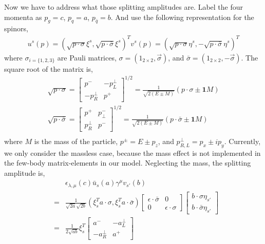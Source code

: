 \begin{appendices}
Now we have to address what those splitting amplitudes are.
Label the four momenta as $p_g = c$, $p_q = a$, $p_{\bar{q}} = b$.
And use the following representation for the spinors,
\begin{eqnarray}
u^s(p) = (\sqrt{p\cdot \sigma} \xi^s, \sqrt{p\cdot \bar{\sigma}} \xi^s)^T
v^s(p) = (\sqrt{p\cdot \sigma} \eta^s, -\sqrt{p\cdot \bar{\sigma}} \eta^s)^T
\end{eqnarray}
where $\sigma_{i=\{1,2,3\}}$ are Pauli matrices, $\sigma = (1_{2\times 2}, \vec{\sigma})$, and $\bar{\sigma} = (1_{2\times 2}, -\vec{\sigma})$.
The square root of the matrix is,
\begin{eqnarray}
\sqrt{p\cdot \sigma} =
\left.
\begin{bmatrix}
p^- & -p_L^\perp \\
-p_R^\perp & p^+
\end{bmatrix}\right.^{1/2} 
= \frac{1}{\sqrt{2(E\pm M)}}(p\cdot\sigma \pm \mathbf{1}M)\\
\sqrt{p\cdot \bar{\sigma}} =
\left.
\begin{bmatrix}
p^+ & p_\perp^- \\
p_R^\perp & p^-
\end{bmatrix}\right.^{1/2} 
= \frac{1}{\sqrt{2(E\pm M)}}(p\cdot\bar{\sigma} \pm \mathbf{1}M)\\
\end{eqnarray}
where $M$ is the mass of the particle, $p^\pm = E\pm p_z$, and $p_{R,L}^\perp = p_x \pm  i p_y$.
Currently, we only consider the massless case, because the mass effect is not implemented in the few-body matrix-elements in our model.
Neglecting the mass, the splitting amplitude is,
\begin{eqnarray}
&&\epsilon_{\lambda, \mu}(c) \bar{u}_s(a)\gamma^\mu v_{s'}(b)\\
&=&\frac{1}{\sqrt{2a}\sqrt{2b}}(\xi^T_s a\cdot\sigma, \xi^T_{s} a\cdot \bar{\sigma})
\begin{bmatrix}
\epsilon\cdot\bar{\sigma} & 0 \\
0 & \epsilon\cdot\sigma
\end{bmatrix}
\begin{bmatrix}
b\cdot\sigma \eta_{s'}\\
b\cdot\bar{\sigma} \eta_{s'}
\end{bmatrix}
\\
&=&\frac{1}{2\sqrt{ab}}
\xi_s^T
\begin{bmatrix}
a^- & -a^\perp_L \\
-a^\perp_R & a^+
\end{bmatrix}

\end{eqnarray}
\end{appendices}
